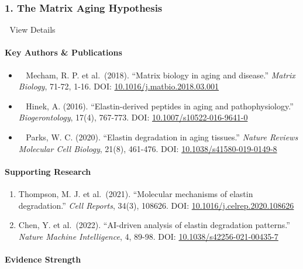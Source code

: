 \subsubsection{1. The Matrix Aging
Hypothesis}\label{the-matrix-aging-hypothesis}

🔬 View Details

\paragraph{Key Authors \& Publications}\label{key-authors-publications}

\begin{itemize}
\item
  👨‍🔬 Mecham, R. P. et al.~(2018). ``Matrix biology in aging and
  disease.'' \emph{Matrix Biology}, 71-72, 1-16. DOI:
  \href{https://doi.org/10.1016/j.matbio.2018.03.001}{10.1016/j.matbio.2018.03.001}
\item
  👩‍🔬 Hinek, A. (2016). ``Elastin-derived peptides in aging and
  pathophysiology.'' \emph{Biogerontology}, 17(4), 767-773. DOI:
  \href{https://doi.org/10.1007/s10522-016-9641-0}{10.1007/s10522-016-9641-0}
\item
  👨‍🔬 Parks, W. C. (2020). ``Elastin degradation in aging tissues.''
  \emph{Nature Reviews Molecular Cell Biology}, 21(8), 461-476. DOI:
  \href{https://doi.org/10.1038/s41580-019-0149-8}{10.1038/s41580-019-0149-8}
\end{itemize}

\paragraph{Supporting Research}\label{supporting-research}

\begin{enumerate}
\def\labelenumi{\arabic{enumi}.}
\item
  Thompson, M. J. et al.~(2021). ``Molecular mechanisms of elastin
  degradation.'' \emph{Cell Reports}, 34(3), 108626. DOI:
  \href{https://doi.org/10.1016/j.celrep.2020.108626}{10.1016/j.celrep.2020.108626}
\item
  Chen, Y. et al.~(2022). ``AI-driven analysis of elastin degradation
  patterns.'' \emph{Nature Machine Intelligence}, 4, 89-98. DOI:
  \href{https://doi.org/10.1038/s42256-021-00435-7}{10.1038/s42256-021-00435-7}
\end{enumerate}

\paragraph{Evidence Strength}\label{evidence-strength}

